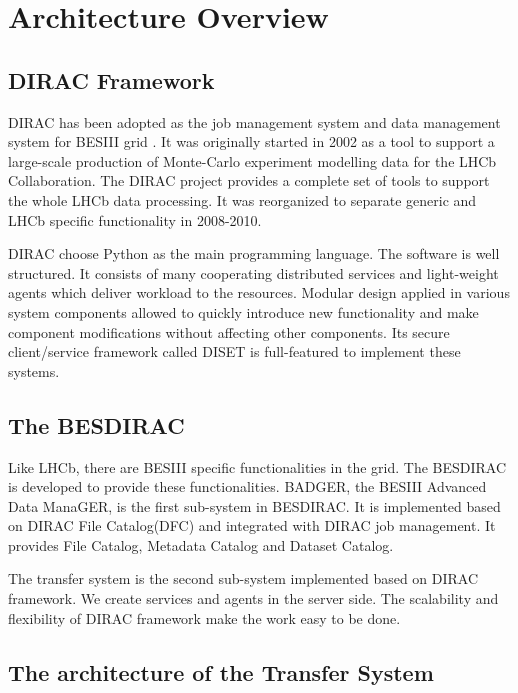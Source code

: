 \section{Architecture Overview}

\subsection{DIRAC Framework}

DIRAC \cite{bib:dirac3} 
has been adopted as the job management system and data management
system for BESIII grid \cite{bib:besdfc}. 
It was originally started in 2002 as a tool
to support a large-scale production of Monte-Carlo experiment modelling
data for the LHCb Collaboration. The DIRAC project provides a 
complete set of tools to support the whole LHCb data processing.
It was reorganized to separate generic and LHCb specific functionality
in 2008-2010.

DIRAC choose Python as the main programming language.
The software is well structured. 
It consists of many cooperating distributed services and light-weight
agents which deliver workload to the resources.
Modular design applied in various system components allowed to quickly
introduce new functionality and make component modifications without
affecting other components.
Its secure client/service framework called DISET \cite{bib:diset} 
is full-featured to implement these systems.

\subsection{The BESDIRAC}

Like LHCb, there are BESIII specific functionalities in the grid.
The BESDIRAC \cite{bib:besdirac} 
is developed to provide these functionalities.
BADGER, the BESIII Advanced Data ManaGER, is the first sub-system
in BESDIRAC. It is implemented based on DIRAC File Catalog(DFC)
and integrated with DIRAC job management.
It provides File Catalog, Metadata Catalog and Dataset Catalog.

The transfer system is the second sub-system implemented based on
DIRAC framework. We create services and agents in the server side.
The scalability and flexibility of DIRAC framework make the work
easy to be done. 

\subsection{The architecture of the Transfer System}

